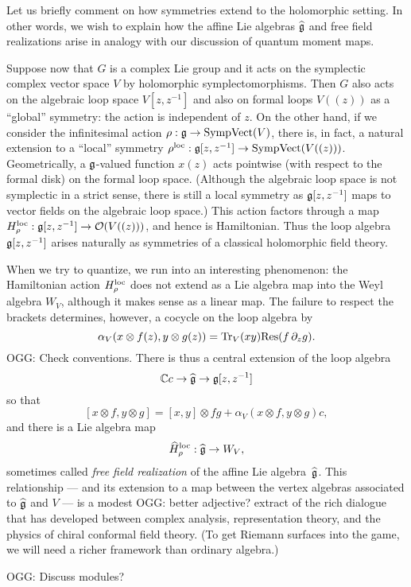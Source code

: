 \documentclass[11pt]{amsart}
\def\owen#1{{\textcolor{green!65!black}{OGG: {#1}}}}
\begin{document}
Let us briefly comment on how symmetries extend to the holomorphic setting.
In other words, we wish to explain how the affine Lie algebras $\widehat{\mathfrak g}$ and free field realizations arise in analogy with our discussion of quantum moment maps.

Suppose now that $G$ is a complex Lie group and it acts on the symplectic complex vector space $V$ by holomorphic symplectomorphisms.
Then $G$ also acts on the algebraic loop space $V[z,z^{-1}]$ and also on formal loops $V((z))$ as a ``global'' symmetry:
the action is independent of $z$.
On the other hand, if we consider the infinitesimal action $\rho: \mathfrak g \to {\rm SympVect}(V)$,
there is, in fact, a natural extension to a ``local'' symmetry $\rho^{\rm loc}: \mathfrak g[z,z^{-1}] \to {\rm SympVect}(V((z)))$.
Geometrically, a $\mathfrak g$-valued function $x(z)$ acts pointwise (with respect to the formal disk) on the formal loop space.
(Although the algebraic loop space is not symplectic in a strict sense,
there is still a local symmetry as $\mathfrak g[z,z^{-1}]$ maps to vector fields on the algebraic loop space.)
This action factors through a map $H_\rho^{\rm loc}: \mathfrak g[z,z^{-1}] \to \mathcal O(V((z)))$,
and hence is Hamiltonian.
Thus the loop algebra $\mathfrak g[z,z^{-1}]$ arises naturally as symmetries of a classical holomorphic field theory.

When we try to quantize, we run into an interesting phenomenon:
the Hamiltonian action $H_\rho^{\rm loc}$ does not extend as a Lie algebra map into the Weyl algebra $W_V$,
although it makes sense as a linear map.
The failure to respect the brackets determines, however, a cocycle on the loop algebra
by
\[
\alpha_V( x \otimes f(z) , y \otimes g(z)) = {\rm Tr}_V(xy) {\rm Res}(f \, \partial_z g).
\]
\owen{Check conventions.}
There is thus a central extension of the loop algebra 
\[
\mathbb C c \to \widehat{\mathfrak g} \to \mathfrak g[z,z^{-1}]
\]
so that 
\[
[x \otimes f, y \otimes g] = [x,y] \otimes fg + \alpha_V( x \otimes f , y \otimes g) c,
\]
and there is a Lie algebra map
\[
\widehat{H}^{\rm loc}_\rho: \widehat{\mathfrak g} \to W_V,
\]
sometimes called {\em free field realization} of the affine Lie algebra~$\widehat{\mathfrak g}$.
This relationship --- and its extension to a map between the vertex algebras associated to $\widehat{\mathfrak g}$ and $V$ --- is a modest \owen{better adjective?} extract of the rich dialogue that has developed between complex analysis, representation theory, and the physics of chiral conformal field theory.
(To get Riemann surfaces into the game, we will need a richer framework than ordinary algebra.)

\owen{Discuss modules?}
\end{document}
